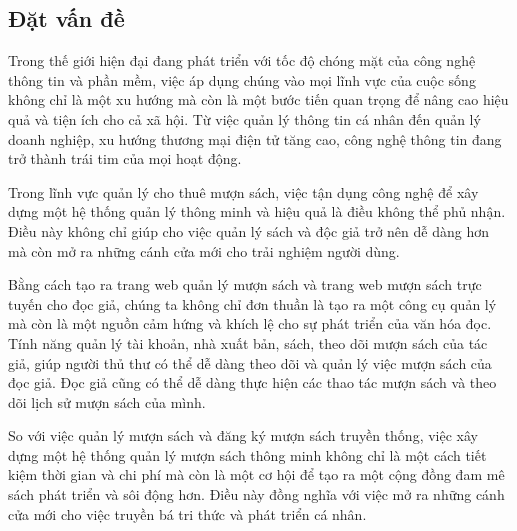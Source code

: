 {}
\setcounter{section}{1}

\subsection{Đặt vấn đề}
Trong thế giới hiện đại đang phát triển với tốc độ chóng mặt của công nghệ thông tin và phần mềm, việc áp dụng chúng vào mọi lĩnh vực của cuộc sống không chỉ là một xu hướng mà còn là một bước tiến quan trọng để nâng cao hiệu quả và tiện ích cho cả xã hội. Từ việc quản lý thông tin cá nhân đến quản lý doanh nghiệp, xu hướng thương mại điện tử tăng cao,  công nghệ thông tin đang trở thành trái tim của mọi hoạt động.\par
Trong lĩnh vực quản lý cho thuê mượn sách, việc tận dụng công nghệ để xây dựng một hệ thống quản lý thông minh và hiệu quả là điều không thể phủ nhận. Điều này không chỉ giúp cho việc quản lý sách và độc giả trở nên dễ dàng hơn mà còn mở ra những cánh cửa mới cho trải nghiệm người dùng.\par
Bằng cách tạo ra trang web quản lý mượn sách và trang web mượn sách trực tuyến cho đọc giả, chúng ta không chỉ đơn thuần là tạo ra một công cụ quản lý mà còn là một nguồn cảm hứng và khích lệ cho sự phát triển của văn hóa đọc. Tính năng quản lý tài khoản, nhà xuất bản, sách, theo dõi mượn sách của tác giả, giúp người thủ thư có thể dễ dàng theo dõi và quản lý việc mượn sách của đọc giả. Đọc giả cũng có thể dễ dàng thực hiện các thao tác mượn sách và theo dõi lịch sử mượn sách của mình.\par
So với việc quản lý mượn sách và đăng ký mượn sách truyền thống, việc xây dựng một hệ thống quản lý mượn sách thông minh không chỉ là một cách tiết kiệm thời gian và chi phí mà còn là một cơ hội để tạo ra một cộng đồng đam mê sách phát triển và sôi động hơn. Điều này đồng nghĩa với việc mở ra những cánh cửa mới cho việc truyền bá tri thức và phát triển cá nhân.



